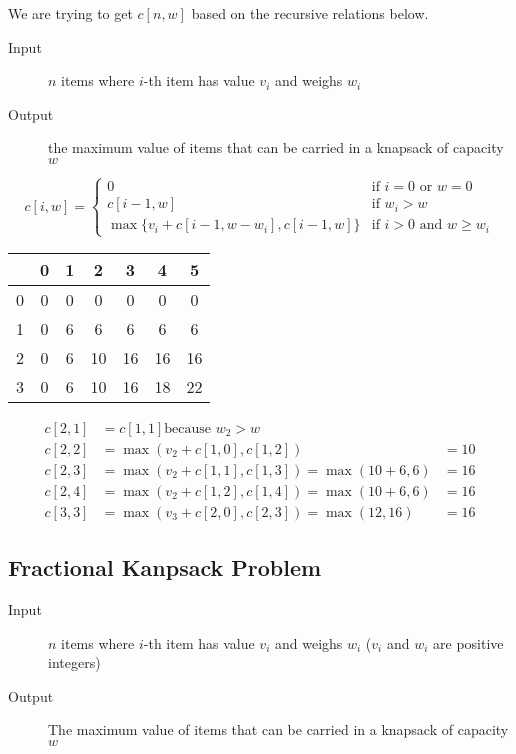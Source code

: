 \documentclass{article}
\begin{document}
We are trying to get \(c[n, w]\) based on the recursive relations below.

\begin{description}
    \item[Input] \(n\) items where \(i\)-th item has value \(v_i\) and weighs \(w_i\)
    \item[Output] the maximum value of items that can be carried in a knapsack of capacity \(w\)
\end{description}

\begin{equation*}
    c[i, w] = \begin{cases}
        0                                      & \text{if }i = 0 \text{ or } w = 0        \\
        c[i - 1, w]                            & \text{if }w_i > w                        \\
        \max\{v_i + c[i-1, w-w_i], c[i-1, w]\} & \text{if } i > 0 \text{ and } w \geq w_i
    \end{cases}
\end{equation*}

\begin{multicols}{2}
    \begin{tabular}{c|cccccc}
          & 0 & 1 & 2  & 3  & 4  & 5  \\
        \hline
        0 & 0 & 0 & 0  & 0  & 0  & 0  \\
        1 & 0 & 6 & 6  & 6  & 6  & 6  \\
        2 & 0 & 6 & 10 & 16 & 16 & 16 \\
        3 & 0 & 6 & 10 & 16 & 18 & 22
    \end{tabular}
    \columnbreak
    \begin{align*}
        c[2,1]  & = c[1,1] \text{because } w_2 > w                      \\
        c[2,2]  & = \max(v_2 + c[1,0], c[1,2])                   & = 10 \\
        c[2, 3] & = \max(v_2 + c[1,1], c[1,3]) = \max(10 + 6, 6) & = 16 \\
        c[2,4]  & = \max(v_2 + c[1,2], c[1,4]) = \max(10+6, 6)   & = 16 \\
        c[3,3]  & = \max(v_3 + c[2,0], c[2,3]) = \max(12, 16)    & = 16
    \end{align*}
\end{multicols}

\subsection*{Fractional Kanpsack Problem}
\begin{description}
    \item[Input]  \(n\) items where \(i\)-th item has value \(v_i\) and weighs \(w_i\) (\(v_i\) and \(w_i\) are positive integers)
    \item[Output] The maximum value of items that can be carried in a knapsack of capacity \(w\)
\end{description}
\end{document}

